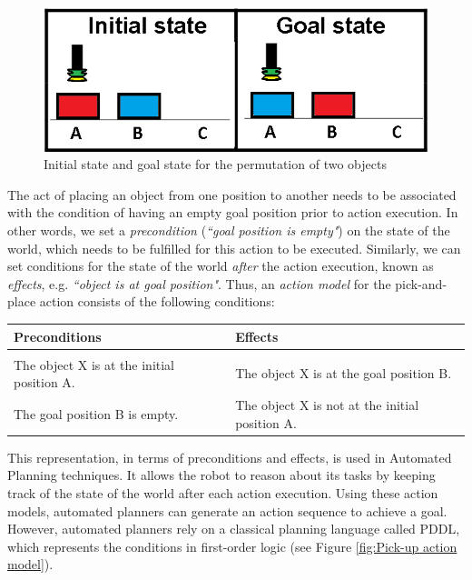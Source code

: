   \begin{figure}[h]
    \centering
    \includegraphics[scale=0.35]{figures/PbD-permutation}
    \caption{Initial state and goal state for the permutation of two objects}
    \label{fig:Permutation}
  \end{figure}
The act of placing an object from one position to another needs to be associated with the condition of having an empty goal position prior to action execution. In other words, we set a \textit{precondition} (\textit{``goal position is empty"}) on the state of the world, which needs to be fulfilled for this action to be executed. Similarly, we can set conditions for the state of the world \textit{after} the action execution, known as \textit{effects}, e.g. \textit{``object is at goal position"}. Thus, an \textit{action model} for the pick-and-place action consists of the following conditions:

\begin{table}[h]
\begin{center}
\begin{tabular}{l|l}
Preconditions & Effects\\ \hline
 & \\
The object X is at the initial position A. & The object X is at the goal position B.\\
The goal position B is empty. & The object X is not at the initial position A.
\end{tabular}
\end{center}
\label{tab:conditions}
\end{table}

\noindent This representation, in terms of preconditions and effects, is used in Automated Planning techniques. It allows the robot to reason about its tasks by keeping track of the state of the world after each action execution. Using these action models, automated planners can generate an action sequence to achieve a goal. However, automated planners rely on a classical planning language called PDDL, which represents the conditions in first-order logic (see Figure \ref{fig:Pick-up action model}). %

